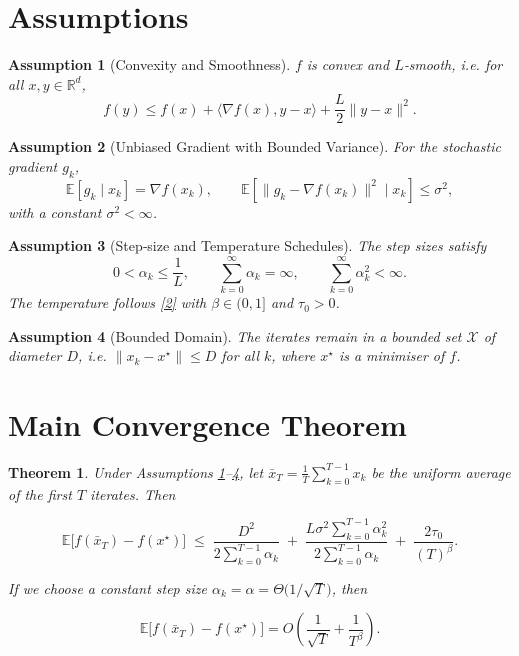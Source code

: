 \documentclass{article}
\newtheorem{theorem}{Theorem}
\newtheorem{assumption}{Assumption}
\newcommand{\E}{\mathbb{E}}
\newcommand{\R}{\mathbb{R}}
\newcommand{\ip}[2]{\langle #1,#2\rangle}
\begin{document}
\section*{Assumptions}
\begin{assumption}[Convexity and Smoothness]\label{asm:convex}
$f$ is convex and $L$‑smooth, i.e. for all $x,y\in\R^{d}$,
\[
f(y)\le f(x)+\ip{\nabla f(x)}{y-x}+\frac{L}{2}\|y-x\|^{2}.
\]
\end{assumption}
\begin{assumption}[Unbiased Gradient with Bounded Variance]\label{asm:grad}
For the stochastic gradient $g_{k}$,
\[
\E\!\left[g_{k}\mid x_{k}\right]=\nabla f(x_{k}),\qquad 
\E\!\left[\|g_{k}-\nabla f(x_{k})\|^{2}\mid x_{k}\right]\le\sigma^{2},
\]
with a constant $\sigma^{2}<\infty$.
\end{assumption}
\begin{assumption}[Step‑size and Temperature Schedules]\label{asm:steps}
The step sizes satisfy 
\[
0<\alpha_{k}\le \frac{1}{L},\qquad 
\sum_{k=0}^{\infty}\alpha_{k}= \infty,\qquad 
\sum_{k=0}^{\infty}\alpha_{k}^{2}<\infty.
\]
The temperature follows \eqref{2} with $\beta\in(0,1]$ and $\tau_{0}>0$.
\end{assumption}
\begin{assumption}[Bounded Domain]\label{asm:bound}
The iterates remain in a bounded set $\mathcal X$ of diameter $D$, i.e. $\|x_{k}-x^{\star}\|\le D$ for all $k$, where $x^{\star}$ is a minimiser of $f$.
\end{assumption}

\section*{Main Convergence Theorem}
\begin{theorem}\label{thm:convergence}
Under Assumptions \ref{asm:convex}–\ref{asm:bound}, let $\bar x_{T}= \frac{1}{T}\sum_{k=0}^{T-1}x_{k}$ be the uniform average of the first $T$ iterates. Then  

\[
\E\!\bigl[f(\bar x_{T})-f(x^{\star})\bigr]
\;\le\;
\frac{D^{2}}{2\sum_{k=0}^{T-1}\alpha_{k}}
\;+\;
\frac{L\sigma^{2}\sum_{k=0}^{T-1}\alpha_{k}^{2}}{2\sum_{k=0}^{T-1}\alpha_{k}}
\;+\;
\frac{2\tau_{0}}{(T)^{\beta}} .
\tag{4}
\]

If we choose a constant step size $\alpha_{k}=\alpha =\Theta\!\bigl(1/\sqrt{T}\bigr)$, then  

\[
\E\!\bigl[f(\bar x_{T})-f(x^{\star})\bigr]=
O\!\left(\frac{1}{\sqrt{T}}+\frac{1}{T^{\beta}}\right).
\] 
\end{theorem}
\end{document}

